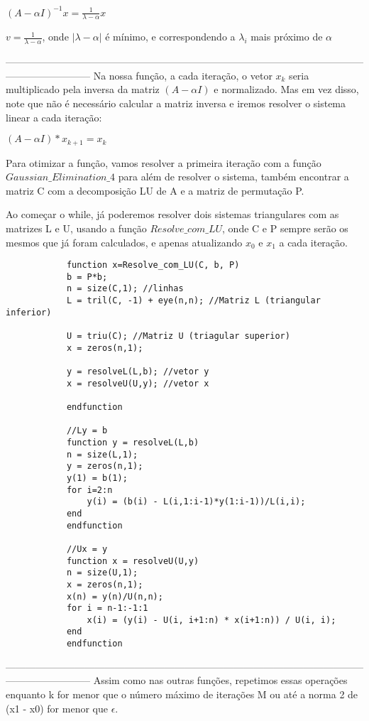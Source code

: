 \documentclass[leqno]{article}
\numberwithin{equation}{section}
\begin{document}
\begin{enumerate}
\begin{sol}
		$(A - \alpha I)^{-1} x = \frac{1}{\lambda - \alpha}x$
		
		$v = \frac{1}{\lambda - \alpha}$, onde $|\lambda - \alpha|$ é mínimo, e correspondendo a $\lambda_i$ mais próximo de $\alpha$
		
		--------------------------------------------------------------------------------------------------------------------------------------
		Na nossa função, a cada iteração, o vetor $x_k$ seria multiplicado pela inversa da matriz $(A - \alpha I)$ e normalizado. Mas em vez disso, note que não é necessário calcular a matriz inversa e iremos resolver o sistema linear a cada iteração:
		
		$(A - \alpha I) * x_{k+1} = x_k$
		
		Para otimizar a função, vamos resolver a primeira iteração com a função $Gaussian\_Elimination\_4$ para além de resolver o sistema, também encontrar a matriz C com a decomposição LU de A e a matriz de permutação P.
		
		Ao começar o while, já poderemos resolver dois sistemas triangulares com as matrizes L e U, usando a função $Resolve\_com\_LU$, onde C e P sempre serão os mesmos que já foram calculados, e apenas atualizando $x_0$ e $x_1$ a cada iteração.
		
		\begin{lstlisting}
			function x=Resolve_com_LU(C, b, P)
			b = P*b;
			n = size(C,1); //linhas
			L = tril(C, -1) + eye(n,n); //Matriz L (triangular inferior)
			
			U = triu(C); //Matriz U (triagular superior)
			x = zeros(n,1);
			
			y = resolveL(L,b); //vetor y
			x = resolveU(U,y); //vetor x 
			
			endfunction
			
			//Ly = b
			function y = resolveL(L,b)
			n = size(L,1);
			y = zeros(n,1);
			y(1) = b(1);
			for i=2:n
				y(i) = (b(i) - L(i,1:i-1)*y(1:i-1))/L(i,i);
			end
			endfunction
			
			//Ux = y
			function x = resolveU(U,y)
			n = size(U,1);
			x = zeros(n,1);
			x(n) = y(n)/U(n,n);
			for i = n-1:-1:1
				x(i) = (y(i) - U(i, i+1:n) * x(i+1:n)) / U(i, i);
			end
			endfunction
		\end{lstlisting}
		
		--------------------------------------------------------------------------------------------------------------------------------------
		Assim como nas outras funções, repetimos essas operações enquanto k for menor que o número máximo de iterações M ou até a norma 2 de (x1 - x0) for menor que $\epsilon$.
	

\end{sol}
\end{enumerate}
\end{document}
